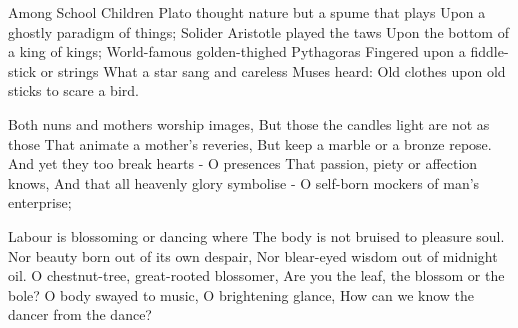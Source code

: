\begin{poem}{Among School Children}
 Plato thought nature but a spume that plays
 Upon a ghostly paradigm of things;
 Solider Aristotle played the taws
 Upon the bottom of a king of kings;
 World-famous golden-thighed Pythagoras
 Fingered upon a fiddle-stick or strings
 What a star sang and careless Muses heard:
 Old clothes upon old sticks to scare a bird.\\
 
 
 Both nuns and mothers worship images,
 But those the candles light are not as those
 That animate a mother's reveries,
 But keep a marble or a bronze repose.
 And yet they too break hearts - O presences
 That passion, piety or affection knows,
 And that all heavenly glory symbolise - 
 O self-born mockers of man's enterprise;\\
 
 
 Labour is blossoming or dancing where
 The body is not bruised to pleasure soul.
 Nor beauty born out of its own despair,
 Nor blear-eyed wisdom out of midnight oil.
 O chestnut-tree, great-rooted blossomer,
 Are you the leaf, the blossom or the bole?
 O body swayed to music, O brightening glance,
 How can we know the dancer from the dance?\\
\end{poem}



